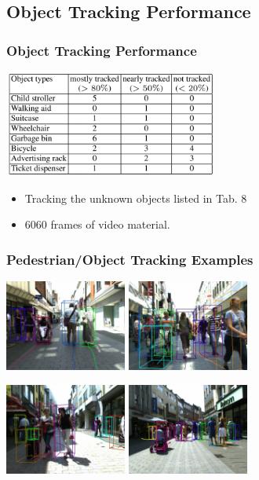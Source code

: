\documentclass{beamer}
\begin{document}
\subsection{Object Tracking Performance}
\begin{frame}
\frametitle{Object Tracking Performance} 
\begin{center}
	\includegraphics[width=7cm]{table.pdf}
\end{center}
\begin{itemize}
	\item Tracking the unknown objects listed in Tab. 8
	\item 6060 frames of video material. 
\end{itemize}
\end{frame}

\begin{frame}
\frametitle{Pedestrian/Object Tracking Examples} 
\begin{center}
  	\includegraphics[width=4cm]{objects1.jpg} \hspace{0.5cm}
  	\includegraphics[width=4cm]{objects2.jpg}
\end{center}
\begin{center}
  	\includegraphics[width=4cm]{objects3.jpg} \hspace{0.5cm}
  	\includegraphics[width=4cm]{objects4.jpg}
\end{center}

\end{frame} 
\end{document}
